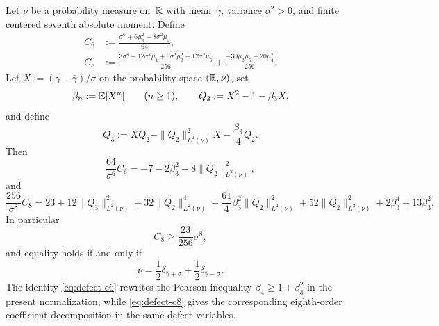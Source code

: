 \begin{theorem}%
\label{thm:poisson-defect-ladder}
Let $\nu$ be a probability measure on~$\mathbb{R}$ with mean~$\bar\gamma$,
variance $\sigma^2>0$, and finite centered seventh absolute moment.  Define
\begin{align*}
C_6&:=\frac{\sigma^6+6\mu_3^2-8\sigma^2\mu_4}{64}, \\
C_8&:=
\frac{3\sigma^8-12\sigma^4\mu_4+9\sigma^2\mu_3^2+12\sigma^2\mu_6}{256}
+\frac{-30\mu_3\mu_5+20\mu_4^2}{256}.
\end{align*}
Let $X:=(\gamma-\bar\gamma)/\sigma$ on the probability space
$(\mathbb{R},\nu)$, set
\[
\beta_n:=\mathbb{E}[X^n]\qquad(n\ge1),
\qquad
Q_2:=X^2-1-\beta_3X,
\]
and define
\[
Q_3:=XQ_2-\|Q_2\|_{L^2(\nu)}^2X-\frac{\beta_3}{4}Q_2.
\]
Then
\begin{equation}\label{eq:defect-c6}
\frac{64}{\sigma^6}C_6
=-7-2\beta_3^2-8\|Q_2\|_{L^2(\nu)}^2,
\end{equation}
and
\begin{equation}\label{eq:defect-c8}
\frac{256}{\sigma^8}C_8
=23
+12\|Q_3\|_{L^2(\nu)}^2
+32\|Q_2\|_{L^2(\nu)}^4
+\frac{61}{4}\beta_3^2\|Q_2\|_{L^2(\nu)}^2
+52\|Q_2\|_{L^2(\nu)}^2
+2\beta_3^4
+13\beta_3^2.
\end{equation}
In particular
\begin{equation}\label{eq:defect-c8-lower}
C_8\ge \frac{23}{256}\sigma^8,
\end{equation}
and equality holds if and only if
\[
\nu=\frac12\delta_{\bar\gamma+\sigma}
+\frac12\delta_{\bar\gamma-\sigma}.
\]
The identity \eqref{eq:defect-c6} rewrites the Pearson inequality
$\beta_4\ge 1+\beta_3^2$ in the present normalization, while
\eqref{eq:defect-c8} gives the corresponding eighth-order coefficient
decomposition in the same defect variables.
\end{theorem}

